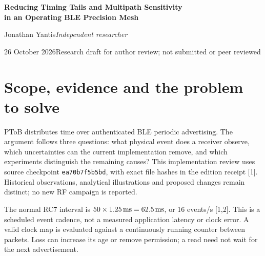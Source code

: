 \documentclass[11pt,letterpaper]{article}
\newcommand{\src}[1]{\nolinkurl{#1}}
\begin{document}
\begin{center}
{\LARGE\bfseries Reducing Timing Tails and Multipath Sensitivity\\[3pt] in an Operating BLE Precision Mesh}\par
\vspace{7pt}Jonathan Yantis\quad\textit{Independent researcher}\par
26 October 2026\quad Research draft for author review; not submitted or peer reviewed
\end{center}
\vspace{-5pt}
\begin{abstract}\noindent
Wireless clock synchronization has long improved precision by removing uncertain software delay from the timestamp path. Multipath leaves a different problem: the receiver detects a composite waveform, while packet loss can age an otherwise correct clock model. This paper connects those established problems to PToB's operating Bluetooth Low Energy mesh. It reviews event association, capture, clock bridging, channel-aware frequency fitting, bounded steering and source ownership, then proposes placement, instrumentation, estimator and scheduling tests on existing Nordic nRF52840 and ESP32-S3 targets. Historical W12 and N30 observations retain distinct populations, missing records and calibration scopes; their tails do not establish multipath causation. Analytical examples expose channel-mix confounding and stale-correction costs. A falsifiable programme combines offline replay with future common-reference tests, frozen images and held-out placements. Improved capture resolution neither identifies the first RF path nor establishes calibrated UTC/output accuracy.
\end{abstract}
\vspace{-5pt}
\section{Scope, evidence and the problem to solve}
PToB distributes time over authenticated BLE periodic advertising. The argument follows three questions: what physical event does a receiver observe, which uncertainties can the current implementation remove, and which experiments distinguish the remaining causes? This implementation review uses source checkpoint \src{ea70b7f5b5bd}, with exact file hashes in the edition receipt [1]. Historical observations, analytical illustrations and proposed changes remain distinct; no new RF campaign is reported.

The normal RC7 interval is $50\times1.25\,\mathrm{ms}=62.5\,\mathrm{ms}$, or 16 events/s [1,2]. This is a scheduled event cadence, not a measured application latency or clock error. A valid clock map is evaluated against a continuously running counter between packets. Loss can increase its age or remove permission; a read need not wait for the next advertisement.
\end{document}
